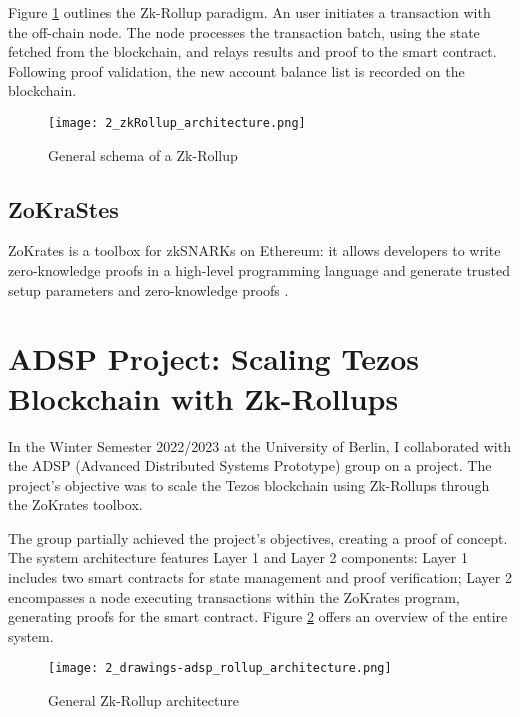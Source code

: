 Figure \ref{fig:2_zkRollup_schema} outlines the Zk-Rollup paradigm. An user initiates a transaction with the off-chain node. The node processes the transaction batch, using the state fetched from the blockchain, and relays results and proof to the smart contract. Following proof validation, the new account balance list is recorded on the blockchain.

\begin{figure}[ht]
  \centering
  \texttt{[image: 2\_zkRollup\_architecture.png]}
  \caption[Zk-Rollup Schema]{General schema of a Zk-Rollup\cite{ise_department_tub_material_nodate}}  
  \label{fig:2_zkRollup_schema}
\end{figure}

\subsection{ZoKraStes}
ZoKrates is a toolbox for zkSNARKs on Ethereum: it allows developers to write zero-knowledge proofs in a high-level programming language and generate trusted setup parameters and zero-knowledge proofs \cite{eberhardt_ZoKrates_2018}.


\section{ADSP Project: Scaling Tezos Blockchain with Zk-Rollups \label{sec:2_adspProject}}
In the Winter Semester 2022/2023 at the University of Berlin, I collaborated with the ADSP (Advanced Distributed Systems Prototype) group on a project. The project's objective was to scale the Tezos blockchain using Zk-Rollups through the ZoKrates toolbox.

The group partially achieved the project's objectives, creating a proof of concept. The system architecture features Layer 1 and Layer 2 components: Layer 1 includes two smart contracts for state management and proof verification; Layer 2 encompasses a node executing transactions within the ZoKrates program, generating proofs for the smart contract. Figure \ref{fig:2_general_rollup_architecture} offers an overview of the entire system.

\begin{figure}[ht]
  \centering
  \texttt{[image: 2\_drawings-adsp\_rollup\_architecture.png]}
  \caption[Zk-Rollup Architecture]{General Zk-Rollup architecture}  
  \label{fig:2_general_rollup_architecture}
\end{figure}

